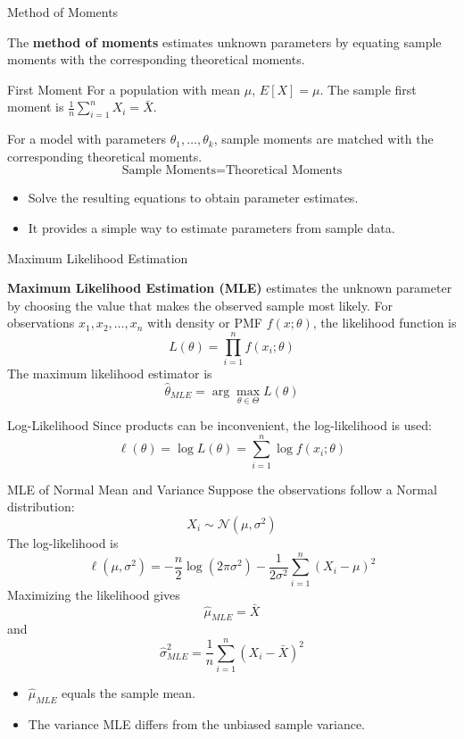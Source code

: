 \documentclass{beamer}
\begin{document}
\begin{frame}{Method of Moments}

The \textbf{method of moments} estimates unknown parameters
by equating sample moments with the corresponding theoretical moments.

\begin{block}{First Moment}
For a population with mean $\mu$, $E[X]=\mu$.
The sample first moment is $\displaystyle \frac{1}{n}\sum_{i=1}^{n}X_i=\bar X$.
\end{block}

For a model with parameters
$\theta_1,\ldots,\theta_k$, sample moments are matched with
the corresponding theoretical moments.
\[
\boxed{
\text{Sample Moments}
=
\text{Theoretical Moments}
}
\]
\begin{itemize}
    \item Solve the resulting equations to obtain parameter estimates.
    \item It provides a simple way to estimate parameters from sample data.
\end{itemize}

\end{frame}



\begin{frame}{Maximum Likelihood Estimation}

\textbf{Maximum Likelihood Estimation (MLE)} estimates the
unknown parameter by choosing the value that makes the observed
sample most likely. For observations $x_1,x_2,\ldots,x_n$ with density or PMF
$f(x;\theta)$, the likelihood function is
\[
\boxed{
L(\theta)
=
\prod_{i=1}^{n} f(x_i;\theta)
}
\]
The maximum likelihood estimator is
\[
\boxed{
\hat{\theta}_{MLE}
=
\arg\max_{\theta\in\Theta} L(\theta)
}
\]

\begin{block}{Log-Likelihood}
Since products can be inconvenient, the log-likelihood is used:
\[
\boxed{
\ell(\theta)
=
\log L(\theta)
=
\sum_{i=1}^{n}\log f(x_i;\theta)
}
\]
\end{block}

\end{frame}


\begin{frame}{MLE of Normal Mean and Variance}
Suppose the observations follow a Normal distribution:
\[
X_i\sim\mathcal{N}(\mu,\sigma^2)
\]
The log-likelihood is
\[
\ell(\mu,\sigma^2)
=
-\frac{n}{2}\log(2\pi\sigma^2)
-\frac{1}{2\sigma^2}
\sum_{i=1}^{n}(X_i-\mu)^2
\]
Maximizing the likelihood gives
\[
\boxed{
\hat{\mu}_{MLE}=\bar X
}
\]
and
\[
\boxed{
\hat{\sigma}^2_{MLE}
=
\frac{1}{n}
\sum_{i=1}^{n}(X_i-\bar X)^2
}
\]

\begin{itemize}
    \item $\hat{\mu}_{MLE}$ equals the sample mean.
    \item The variance MLE differs from the unbiased sample variance.
\end{itemize}

\end{frame}
\end{document}
